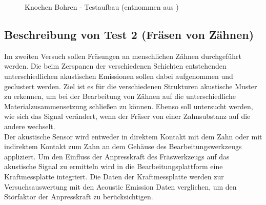 \documentclass[twoside, 12pt, a4paper]{article}
\begin{document}
	
	
		\begin{figure}[!htbp]
		\centering
		\setlength{\fboxsep}{0.5pt}
		\setlength{\fboxrule}{0.5pt}
		\caption[Knochen Bohren]{Knochen Bohren - Testaufbau (entnommen aus \cite[S. 6]{Dentsply.21.04.2020})}
		\label{img:Knochen Bohren}
	\end{figure}
	\FloatBarrier
	
\subsection{Beschreibung von Test 2 (Fr\"asen von Z\"ahnen)}	

Im zweiten Versuch sollen Fr\"asungen an menschlichen Z\"ahnen durchgef\"uhrt werden. Die beim Zerspanen der verschiedenen Schichten entstehenden unterschiedlichen akustischen Emissionen sollen dabei aufgenommen und geclustert werden. Ziel ist es f\"ur die verschiedenen Strukturen akustische Muster zu erkennen, um bei der Bearbeitung von Z\"ahnen auf die unterschiedliche Materialzusammensetzung schlie{\ss}en zu k\"onnen. Ebenso soll untersucht werden, wie sich das Signal ver\"andert, wenn der Fr\"aser von einer Zahnsubstanz auf die andere wechselt.\\
Der akustische Sensor wird entweder in direktem Kontakt mit dem Zahn oder mit indirektem Kontakt zum Zahn an dem Geh\"ause des Bearbeitungswerkzeugs appliziert. Um den Einfluss der Anpresskraft des Fr\"aswerkzeugs auf das akustische Signal zu ermitteln wird in die Bearbeitungsplattform eine Kraftmessplatte integriert. Die Daten der Kraftmessplatte werden zur Versuchsauswertung mit den Acoustic Emission Daten verglichen, um den St\"orfaktor der Anpresskraft zu ber\"ucksichtigen.
\end{document}
